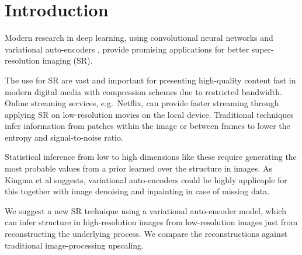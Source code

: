 \section{Introduction}
\label{sec:introduction}
Modern research in deep learning, using convolutional neural networks \cite{Dong15} and variational auto-encoders \cite{Kingma2013, Johnson16}, provide promising applications for better super-resolution imaging (SR).  

The use for SR are vast and important for presenting high-quality content fast in modern digital media with compression schemes due to restricted bandwidth. Online streaming services, e.g.\ Netflix, can provide faster streaming through applying SR on low-resolution movies on the local device. Traditional techniques infer information from patches within the image or between frames to lower the entropy and signal-to-noise ratio. 

Statistical inference from low to high dimensions like these  require generating the most probable values from a prior learned over the structure in images. As Kingma et al \cite{Kingma2013} suggests, variational auto-encoders could be highly applicaple for this together with image denoising and inpainting in case of missing data.

We suggest a new SR technique using a variational auto-encoder model, which can infer structure in high-resolution images from low-resolution images just from reconstructing the underlying process. We compare the reconstructions against traditional image-processing upscaling.

